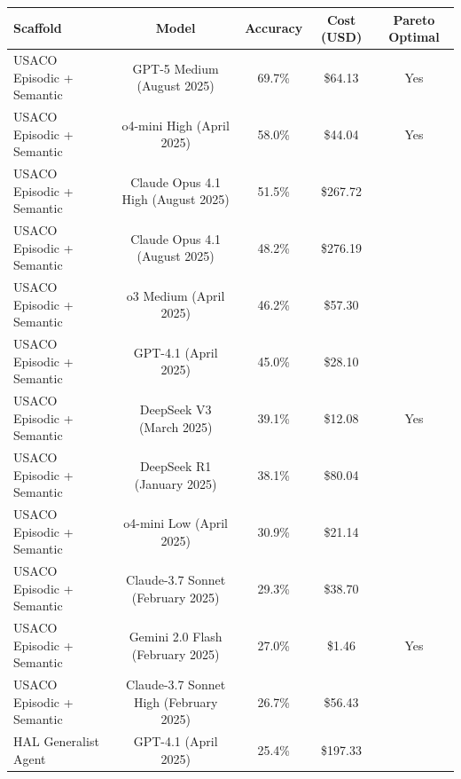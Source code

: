 \begin{tabular}{lcccc}
\toprule
Scaffold & Model & Accuracy & Cost (USD) & Pareto Optimal \\
\midrule
USACO Episodic + Semantic & GPT-5 Medium (August 2025) & 69.7\% & \$64.13 & Yes \\
USACO Episodic + Semantic & o4-mini High (April 2025) & 58.0\% & \$44.04 & Yes \\
USACO Episodic + Semantic & Claude Opus 4.1 High (August 2025) & 51.5\% & \$267.72 &  \\
USACO Episodic + Semantic & Claude Opus 4.1 (August 2025) & 48.2\% & \$276.19 &  \\
USACO Episodic + Semantic & o3 Medium (April 2025) & 46.2\% & \$57.30 &  \\
USACO Episodic + Semantic & GPT-4.1 (April 2025) & 45.0\% & \$28.10 &  \\
USACO Episodic + Semantic & DeepSeek V3 (March 2025) & 39.1\% & \$12.08 & Yes \\
USACO Episodic + Semantic & DeepSeek R1 (January 2025) & 38.1\% & \$80.04 &  \\
USACO Episodic + Semantic & o4-mini Low (April 2025) & 30.9\% & \$21.14 &  \\
USACO Episodic + Semantic & Claude-3.7 Sonnet (February 2025) & 29.3\% & \$38.70 &  \\
USACO Episodic + Semantic & Gemini 2.0 Flash (February 2025) & 27.0\% & \$1.46 & Yes \\
USACO Episodic + Semantic & Claude-3.7 Sonnet High (February 2025) & 26.7\% & \$56.43 &  \\
HAL Generalist Agent & GPT-4.1 (April 2025) & 25.4\% & \$197.33 &  \\
\bottomrule
\end{tabular}